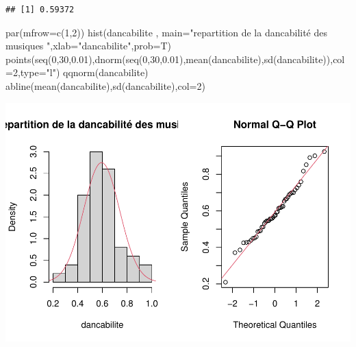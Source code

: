 \documentclass[
]{article}
\newenvironment{Shaded}{\begin{snugshade}}{\end{snugshade}}
\newcommand{\AttributeTok}[1]{\textcolor[rgb]{0.77,0.63,0.00}{#1}}
\newcommand{\DecValTok}[1]{\textcolor[rgb]{0.00,0.00,0.81}{#1}}
\newcommand{\FloatTok}[1]{\textcolor[rgb]{0.00,0.00,0.81}{#1}}
\newcommand{\FunctionTok}[1]{\textcolor[rgb]{0.00,0.00,0.00}{#1}}
\newcommand{\NormalTok}[1]{#1}
\newcommand{\OtherTok}[1]{\textcolor[rgb]{0.56,0.35,0.01}{#1}}
\newcommand{\SpecialCharTok}[1]{\textcolor[rgb]{0.00,0.00,0.00}{#1}}
\newcommand{\StringTok}[1]{\textcolor[rgb]{0.31,0.60,0.02}{#1}}
\begin{document}
\begin{verbatim}
## [1] 0.59372
\end{verbatim}

\begin{Shaded}
\begin{Highlighting}[]
\FunctionTok{par}\NormalTok{(}\AttributeTok{mfrow=}\FunctionTok{c}\NormalTok{(}\DecValTok{1}\NormalTok{,}\DecValTok{2}\NormalTok{))}
\FunctionTok{hist}\NormalTok{(dancabilite , }\AttributeTok{main=}\StringTok{"repartition de la dancabilité des musiques "}\NormalTok{,}\AttributeTok{xlab=}\StringTok{"dancabilite"}\NormalTok{,}\AttributeTok{prob=}\NormalTok{T)}
\FunctionTok{points}\NormalTok{(}\FunctionTok{seq}\NormalTok{(}\DecValTok{0}\NormalTok{,}\DecValTok{30}\NormalTok{,}\FloatTok{0.01}\NormalTok{),}\FunctionTok{dnorm}\NormalTok{(}\FunctionTok{seq}\NormalTok{(}\DecValTok{0}\NormalTok{,}\DecValTok{30}\NormalTok{,}\FloatTok{0.01}\NormalTok{),}\FunctionTok{mean}\NormalTok{(dancabilite),}\FunctionTok{sd}\NormalTok{(dancabilite)),}\AttributeTok{col=}\DecValTok{2}\NormalTok{,}\AttributeTok{type=}\StringTok{"l"}\NormalTok{)}
\FunctionTok{qqnorm}\NormalTok{(dancabilite)}
\FunctionTok{abline}\NormalTok{(}\FunctionTok{mean}\NormalTok{(dancabilite),}\FunctionTok{sd}\NormalTok{(dancabilite),}\AttributeTok{col=}\DecValTok{2}\NormalTok{)}
\end{Highlighting}
\end{Shaded}

\includegraphics{spotify_analysis_files/figure-latex/unnamed-chunk-7-1.pdf}

\begin{Shaded}
\end{Shaded}
\end{document}
